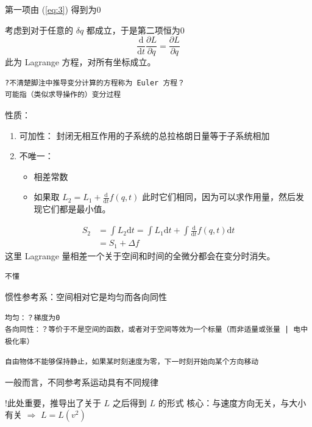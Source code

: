 \documentclass[11pt]{article}
\begin{document}
第一项由
(\ref{eq:3})
得到为0

考虑到对于任意的 \(\delta q\) 都成立，于是第二项恒为0
\begin{equation}
\label{eq:LagrangeEqu}
\frac{\mathrm{d}}{\mathrm{d}t}\frac{\partial L}{\partial \dot{q}}=\frac{\partial L}{\partial q}
\end{equation}
此为 Lagrange 方程，对所有坐标成立。

\begin{verbatim}
?不清楚脚注中推导变分计算的方程称为 Euler 方程？
可能指（类似求导操作的）变分过程
\end{verbatim}

性质：
\begin{enumerate}
\item 可加性：
封闭无相互作用的子系统的总拉格朗日量等于子系统相加
\item 不唯一：
\begin{itemize}
\item 相差常数
\item 如果取  \(L_2=L_1+\frac{\mathrm{d}}{\mathrm{d}t}f(q,t)\) 此时它们相同，因为可以求作用量，然后发现它们都是最小值。
\end{itemize}
\end{enumerate}
\begin{equation}
\label{eq:6}
\begin{split}
S_2&=\int L_2 \mathrm{d}t=\int L_1\mathrm{d}t + \int\frac{\mathrm{d}}{\mathrm{d}t}f(q,t)\mathrm{d}t \\
&=S_1+\Delta f
\end{split}
\end{equation}
这里 Lagrange 量相差一个关于空间和时间的全微分都会在变分时消失。

\begin{verbatim}
不懂
\end{verbatim}

惯性参考系：空间相对它是均匀而各向同性

\begin{verbatim}
均匀：？梯度为0
各向同性：？等价于不是空间的函数，或者对于空间等效为一个标量（而非适量或张量 | 电中极化率）
\end{verbatim}


\begin{verbatim}
自由物体不能够保持静止，如果某时刻速度为零，下一时刻开始向某个方向移动
\end{verbatim}
一般而言，不同参考系运动具有不同规律

!此处重要，推导出了关于 \(L\) 之后得到 \(L\) 的形式
核心：与速度方向无关，与大小有关 \(\Rightarrow\) \(L=L(v^2)\)
\end{document}
